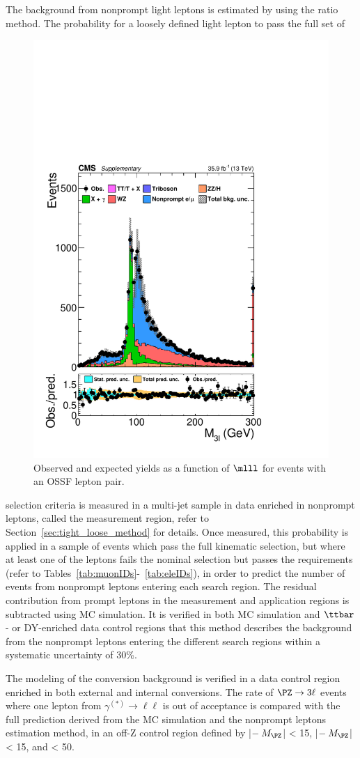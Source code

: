 The background from nonprompt light leptons is estimated by using the \ttol ratio method. 
The probability for a loosely defined light lepton to pass the full
set of
 \begin{figure}
\centering
    \includegraphics[width=.38\textwidth]{Figures/c5/distribution/SR/M3l_baseline_3lOSSF_noSignal_lin.pdf}
\caption{Observed and expected yields as a function of $\mlll$
for events with an OSSF lepton pair. \willem}
\label{fig:willem3L}
\end{figure}
 selection criteria is measured in a multi-jet sample in data enriched
 in nonprompt leptons, called the measurement region, refer to
 Section~\ref{sec:tight_loose_method} for details.
Once measured, this probability is applied in a sample of events which
pass the full kinematic selection, but where at least one of the
leptons fails the nominal selection but passes the \fo requirements
(refer to Tables~\ref{tab:muonIDs}-~\ref{tab:eleIDs}), 
in order to predict the number of events from nonprompt leptons entering each search region. 
The residual contribution from prompt leptons in the measurement and application regions is subtracted using MC simulation. 
It is verified in both MC simulation and $\ttbar$- or DY-enriched data control regions that this method describes the background from the nonprompt leptons entering the different search regions within 
a systematic uncertainty of 30\%. 
 
The modeling of the conversion background is verified in a data control region enriched in both external and internal conversions. 
The rate of $\PZ \to 3\ell$ events where one lepton from $\gamma^{(*)}\to\ell\ell$ is out of acceptance is compared with 
the full prediction derived from the MC simulation and the nonprompt leptons estimation method, in an off-Z control region 
defined by |\Mll $- \:M_\PZ$| < 15\GeV, |\mlll $- \:M_\PZ$| < 15\GeV,
and \ptmiss < 50\GeV. 


